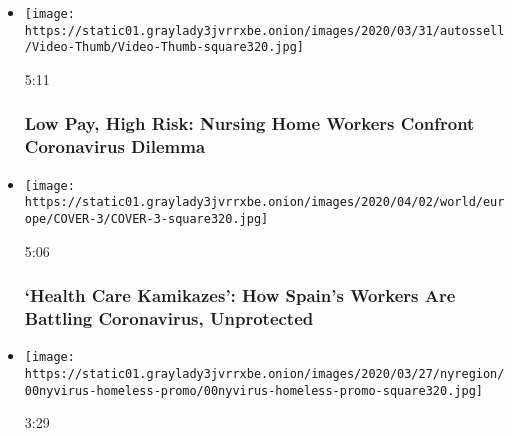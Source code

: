 \begin{itemize}
\item
  \href{https://www.nytimes3xbfgragh.onion/video/us/100000007046988/nursing-home-coronavirus.html?action=click\&module=video-series-bar\&region=header\&pgtype=Article\&playlistId=video/coronavirus-news-update}{}

  \texttt{[image: https://static01.graylady3jvrrxbe.onion/images/2020/03/31/autossell/Video-Thumb/Video-Thumb-square320.jpg]}

  5:11

  \hypertarget{low-pay-high-risk-nursing-home-workers-confront-coronavirus-dilemma}{%
  \subsubsection{Low Pay, High Risk: Nursing Home Workers Confront
  Coronavirus
  Dilemma}\label{low-pay-high-risk-nursing-home-workers-confront-coronavirus-dilemma}}
\item
  \href{https://www.nytimes3xbfgragh.onion/video/world/europe/100000007051789/coronavirus-ppe-shortage-health-care-workers.html?action=click\&module=video-series-bar\&region=header\&pgtype=Article\&playlistId=video/coronavirus-news-update}{}

  \texttt{[image: https://static01.graylady3jvrrxbe.onion/images/2020/04/02/world/europe/COVER-3/COVER-3-square320.jpg]}

  5:06

  \hypertarget{health-care-kamikazes-how-spains-workers-are-battling-coronavirus-unprotected}{%
  \subsubsection{`Health Care Kamikazes': How Spain's Workers Are
  Battling Coronavirus,
  Unprotected}\label{health-care-kamikazes-how-spains-workers-are-battling-coronavirus-unprotected}}
\item
  \href{https://www.nytimes3xbfgragh.onion/video/nyregion/nyregionspecial/100000007054051/shes-an-honors-student-and-homeless-will-the-virtual-classroom-reach-her.html?action=click\&module=video-series-bar\&region=header\&pgtype=Article\&playlistId=video/coronavirus-news-update}{}

  \texttt{[image: https://static01.graylady3jvrrxbe.onion/images/2020/03/27/nyregion/00nyvirus-homeless-promo/00nyvirus-homeless-promo-square320.jpg]}

  3:29

  \hypertarget{shes-an-honors-student-and-homeless-will-the-virtual-classroom-reach-her}{%
}
\end{itemize}
